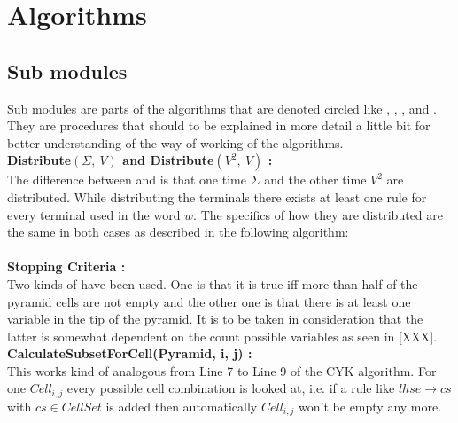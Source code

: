 
\section{Algorithms}\label{algorithms}
\subsection{Sub modules}
Sub modules are parts of the algorithms that are denoted circled like , , ,  and . They are procedures that should to be explained in more detail a little bit for better understanding of the way of working of the algorithms.\\

\noindent \textbf{Distribute$(\Sigma,\ V) $  and Distribute$(V^2,\ V)$ :}\\
The difference between  and  is that one time $\Sigma$ and the other time $V^2$ are distributed. While distributing the terminals there exists at least one rule for every terminal used in the word $w$. The specifics of how they are distributed are the same in both cases as described in the following algorithm: \\

\noindent
{} \\

\noindent \textbf{Stopping Criteria :}\\
Two kinds of  have been used. One is that it is true iff more than half of the pyramid cells are not empty and the other one is that there is at least one variable in the tip of the pyramid. It is to be taken in consideration that the latter is somewhat dependent on the count possible variables as seen in [XXX]. \\

\noindent \textbf{CalculateSubsetForCell(Pyramid, i, j) :}\\
This works kind of analogous from Line 7 to Line 9 of the CYK algorithm. 
For one $Cell_{i,j}$ every possible cell combination is looked at, i.e. if a rule like $lhse \rightarrow cs$ with $cs \in CellSet$ is added then automatically $Cell_{i,j}$ won't be empty any more.\\


